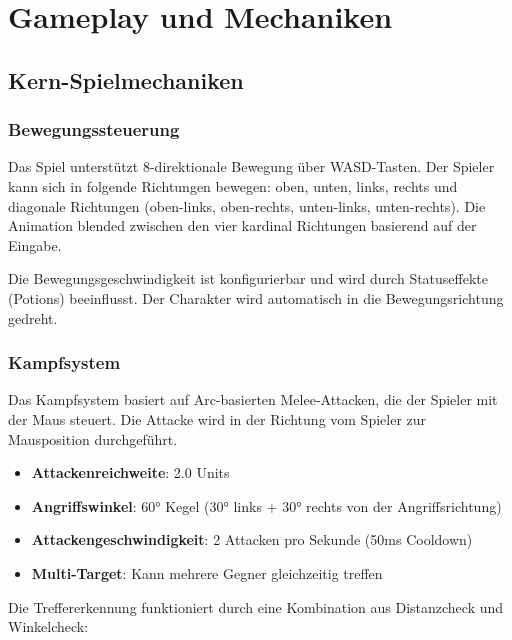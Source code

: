 \documentclass[
  a4paper,
  11pt,
  ngerman,
  parskip=half,
  bibliography=totoc,
  listof=totoc
]{scrreprt}
\begin{document}

\chapter{Gameplay und Mechaniken}

\section{Kern-Spielmechaniken}

\subsection{Bewegungssteuerung}

Das Spiel unterstützt 8-direktionale Bewegung über WASD-Tasten. Der Spieler kann sich in folgende Richtungen bewegen: oben, unten, links, rechts und diagonale Richtungen (oben-links, oben-rechts, unten-links, unten-rechts). Die Animation blended zwischen den vier kardinal Richtungen basierend auf der Eingabe.

Die Bewegungsgeschwindigkeit ist konfigurierbar und wird durch Statuseffekte (Potions) beeinflusst. Der Charakter wird automatisch in die Bewegungsrichtung gedreht.

\subsection{Kampfsystem}

Das Kampfsystem basiert auf Arc-basierten Melee-Attacken, die der Spieler mit der Maus steuert. Die Attacke wird in der Richtung vom Spieler zur Mausposition durchgeführt.

\begin{itemize}
    \item \textbf{Attackenreichweite}: 2.0 Units
    \item \textbf{Angriffswinkel}: 60° Kegel (30° links + 30° rechts von der Angriffsrichtung)
    \item \textbf{Attackengeschwindigkeit}: 2 Attacken pro Sekunde (50ms Cooldown)
    \item \textbf{Multi-Target}: Kann mehrere Gegner gleichzeitig treffen
\end{itemize}

Die Treffererkennung funktioniert durch eine Kombination aus Distanzcheck und Winkelcheck:
\end{document}
